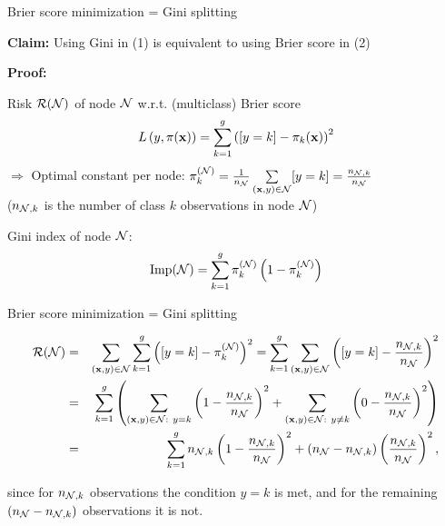 \documentclass[11pt,compress,t,notes=noshow, xcolor=table]{beamer}
\begin{document}
\begin{vbframe}{Brier score minimization = Gini splitting}

\textbf{Claim:} Using Gini in (1) 
    is equivalent to using Brier score in (2) %
    

\textbf{Proof:} %

Risk $\mathcal{R}(\mathcal{N})$ of node $\mathcal{N}$ w.r.t. (multiclass) Brier score
$$
  L\left(y, \pi(\mathbf{x})\right) = \sum_{k = 1}^g \left([y = k] - \pi_k(\mathbf{x})\right)^2
$$
$\Rightarrow$ Optimal constant per node: $\pi_k^{(\mathcal{N})} = \frac{1}{n_{\mathcal{N}}} \sum\limits_{(\mathbf{x},y) \in \mathcal{N}} [y = k] = \frac{n_{\mathcal{N},k}}{n_{\mathcal{N} }}$ \\ ($n_{\mathcal{N},k}$ is the number of class $k$ observations in node $\mathcal{N}$) \\

\lz

Gini index of node $\mathcal{N}$:
$$
\text{Imp}(\Np) = \sum_{k=1}^g \pikN \left(1-\pikN \right) %
$$


\end{vbframe}
\begin{vbframe}{Brier score minimization = Gini splitting}

\begin{footnotesize}
\begin{eqnarray*}
\mathcal{R}(\mathcal{N}) &=& \sum_{(\mathbf{x}, y) \in \mathcal{N}}  \sum_{k = 1}^g \left([y = k] - \pi_k^{(\mathcal{N})}\right)^2 
= \sum_{k = 1}^g \sum_{(\mathbf{x}, y) \in \mathcal{N}} \left([y = k] - \frac{n_{\mathcal{N},k}}{n_{\mathcal{N} }}\right)^2\\
&=& \sum_{k = 1}^{g} \left(\sum_{(\mathbf{x}, y) \in \mathcal{N}: ~ y = k} \left(1 - \frac{n_{\mathcal{N},k}}{n_{\mathcal{N} }}\right)^2 + \sum_{(\mathbf{x}, y) \in \mathcal{N}: ~ y \ne k} \left(0 - \frac{n_{\mathcal{N},k}}{n_{\mathcal{N} }}\right)^2\right) \\
&=& \sum_{k = 1}^g n_{\mathcal{N},k}\left(1 - \frac{n_{\mathcal{N},k}}{n_{\mathcal{N} }}\right)^2 + (n_{\mathcal{N} } - n_{\mathcal{N},k})\left(\frac{n_{\mathcal{N},k}}{n_{\mathcal{N} }}\right)^2, 
\end{eqnarray*}

since for $n_{\mathcal{N},k}$ observations the condition $y = k$ is met, and for the remaining $(n_{\mathcal{N}} - n_{\mathcal{N},k})$ observations it is not. 

\end{footnotesize}

\end{vbframe}
\end{document}
